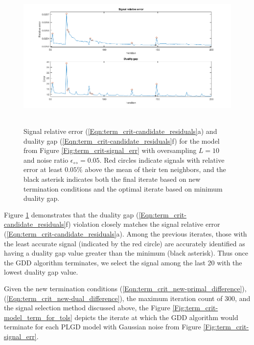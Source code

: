 \begin{figure}[H]
\centering
\hbox{\hspace{-1.7cm} \includegraphics[scale=0.6]{term_crit-duality_gap} }
\caption{Signal relative error (\ref{Eqn:term_crit-candidate_residuals}a) and duality gap (\ref{Eqn:term_crit-candidate_residuals}f) for the model from Figure \ref{Fig:term_crit-signal_err} with oversampling $L = 10$ and noise ratio $\epsilon_\rel = 0.05$. Red circles indicate signals with relative error at least $0.05\%$ above the mean of their ten neighbors, and the black asterisk indicates both the final iterate based on new termination conditions and the optimal iterate based on minimum duality gap.}
\label{Fig:term_crit-duality_gap}
\end{figure}




Figure \ref{Fig:term_crit-duality_gap} demonstrates that the duality gap (\ref{Eqn:term_crit-candidate_residuals}f) violation closely matches the signal relative error (\ref{Eqn:term_crit-candidate_residuals}a).  Among the previous iterates, those with the least accurate signal (indicated by the red circle) are accurately identified as having a duality gap value greater than the minimum (black asterisk).  Thus once the GDD algorithm terminates, we select the signal among the last 20 with the lowest duality gap value.








Given the new termination conditions (\ref{Eqn:term_crit_new-primal_difference}), (\ref{Eqn:term_crit_new-dual_difference}), the maximum iteration count of 300, and the signal selection method discussed above, the Figure \ref{Fig:term_crit-model_term_for_tols} depicts the iterate at which the GDD algorithm would terminate for each PLGD model with Gaussian noise from Figure \ref{Fig:term_crit-signal_err}.

